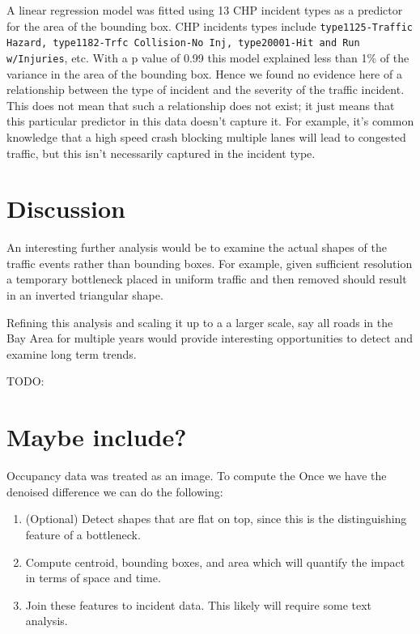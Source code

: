 \documentclass[12pt]{article}
\begin{document}
A linear regression model was fitted using 13 CHP incident types as a
predictor for the area of the bounding box. CHP incidents types include
\texttt{type1125-Traffic Hazard, type1182-Trfc Collision-No Inj,
type20001-Hit and Run w/Injuries}, etc. With a p value of 0.99 this model
explained less than 1\% of the variance in the area of the bounding box.
Hence we found no evidence here of a relationship between the type of incident
and the severity of the traffic incident. This does not mean that such a
relationship does not exist; it just means that this particular predictor
in this data doesn't capture it. For example, it's common knowledge that a
high speed crash blocking multiple lanes will lead to congested traffic,
but this isn't necessarily captured in the incident type.

\section{Discussion}

An interesting further analysis would be to examine the actual shapes of
the traffic events rather than bounding boxes. For example, given
sufficient resolution a temporary bottleneck placed in uniform traffic and
then removed should result in an inverted triangular shape.

Refining this analysis and scaling it up to a a larger scale, say all roads
in the Bay Area for multiple years would provide interesting opportunities to
detect and examine long term trends.

TODO:

 



\section*{Maybe include?}

Occupancy data was treated as an image. To compute the 
Once we have the denoised difference we can do the following:
\begin{enumerate}
    \item (Optional) Detect shapes that are flat on top, since this is the
        distinguishing feature of a bottleneck.
    \item Compute centroid, bounding boxes, and area which will quantify the impact
        in terms of space and time.
    \item Join these features to incident data. This likely will require some text
        analysis.
\end{enumerate}
\end{document}
